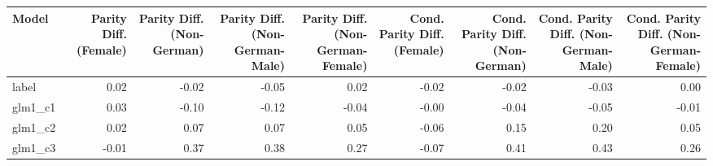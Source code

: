 \begin{tabular}{lrrrrrrrr}
\toprule
Model & Parity Diff. (Female) & Parity Diff. (Non-German) & Parity Diff. (Non-German-Male) & Parity Diff. (Non-German-Female) & Cond. Parity Diff. (Female) & Cond. Parity Diff. (Non-German) & Cond. Parity Diff. (Non-German-Male) & Cond. Parity Diff. (Non-German-Female) \\
\midrule
label & 0.02 & -0.02 & -0.05 & 0.02 & -0.02 & -0.02 & -0.03 & 0.00 \\
glm1_c1 & 0.03 & -0.10 & -0.12 & -0.04 & -0.00 & -0.04 & -0.05 & -0.01 \\
glm1_c2 & 0.02 & 0.07 & 0.07 & 0.05 & -0.06 & 0.15 & 0.20 & 0.05 \\
glm1_c3 & -0.01 & 0.37 & 0.38 & 0.27 & -0.07 & 0.41 & 0.43 & 0.26 \\
\bottomrule
\end{tabular}
